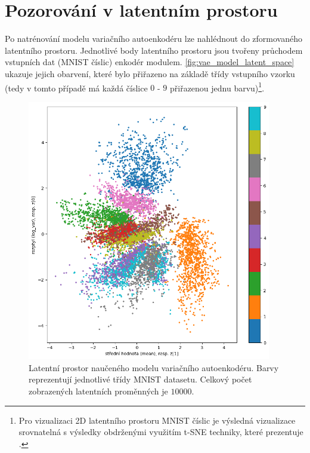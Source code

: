 \section{Pozorování v latentním prostoru}
\label{sec:vae_model_latent_space_observation}

Po natrénování modelu variačního autoenkodéru lze nahlédnout do zformovaného latentního prostoru.
Jednotlivé body latentního prostoru jsou tvořeny průchodem vstupních dat (MNIST číslic) enkodér modulem.
\autoref{fig:vae_model_latent_space} ukazuje jejich obarvení, které bylo přiřazeno na základě třídy vstupního vzorku (tedy v tomto případě má každá číslice $0$ - $9$ přiřazenou jednu barvu)\footnote{Pro vizualizaci 2D latentního prostoru MNIST číslic je výsledná vizualizace srovnatelná s výsledky obdrženými využitím t-SNE techniky, které prezentuje \textcite{Hinton2002}.}.


\begin{figure}[H]
    \centering
    \includegraphics[width=0.95\textwidth]{figures/vae_model_latent_space_500_epochs.png}
    \caption{Latentní prostor naučeného modelu variačního autoenkodéru. Barvy reprezentují jednotlivé třídy MNIST datasetu. Celkový počet zobrazených latentních proměnných je $10 000$.}
    \label{fig:vae_model_latent_space}
\end{figure}

